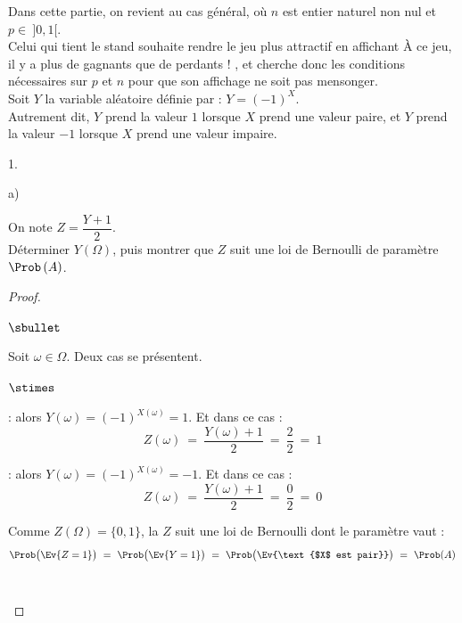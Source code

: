 \noindent
Dans cette partie, on revient au cas général, où $n$ est entier
naturel non nul et $p \in \ ]0,1[$.\\
Celui qui tient le stand souhaite rendre le jeu plus attractif en
affichant \og À ce jeu, il y a plus de gagnants que de perdants ! \fg,
et cherche donc les conditions nécessaires sur $p$ et $n$ pour que son
affichage ne soit pas mensonger.\\
Soit $Y$ la variable aléatoire définie par : $Y = (-1)^{X}$.\\
Autrement dit, $Y$ prend la valeur $1$ lorsque $X$ prend une valeur
paire, et $Y$ prend la valeur $-1$ lorsque $X$ prend une valeur
impaire.
\begin{noliste}{1.}
  \setlength{\itemsep}{4mm}
\item
  \begin{noliste}{a)} 
    \setlength{\itemsep}{2mm}
  \item On note $Z = \dfrac{Y + 1}{2}$.\\[.2cm]
    Déterminer $Y(\Omega)$, puis montrer que $Z$ suit une loi de
    Bernoulli de paramètre $\Prob\left( A \right)$.

    \begin{proof}~%
      \begin{noliste}{$\sbullet$}
      \item Soit $\omega \in \Omega$. Deux cas se présentent.
        \begin{noliste}{$\stimes$}
        \item {} : alors $Y(\omega) =
          (-1)^{X(\omega)} = 1$. Et dans ce cas :
          \[
          Z(\omega) \ = \ \dfrac{Y(\omega) + 1}{2} \ = \ \dfrac{2}{2}
          \ = \ 1
          \]
        \item {} : alors $Y(\omega)
          = (-1)^{X(\omega)} = -1$.  Et dans ce cas :
          \[
          Z(\omega) \ = \ \dfrac{Y(\omega) + 1}{2} \ = \ \dfrac{0}{2}
          \ = \ 0
          \]
        \end{noliste}

      \item Comme $Z(\Omega) = \{0, 1\}$, la \var $Z$ suit une loi de
        Bernoulli dont le paramètre vaut :
        \[
        \Prob\big( \Ev{Z = 1} \big) \ = \ \Prob\big( \Ev{Y = 1} \big)
        \ = \ \Prob\big( \Ev{\text{$X$ est pair}} \big) \ = \ \Prob(A)
        \]
        ~\\[-1.2cm]
      \end{noliste}
    \end{proof}


\end{noliste}
\end{noliste}
